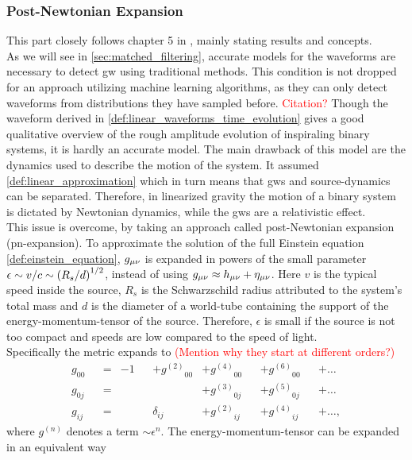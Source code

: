 \subsubsection{Post-Newtonian Expansion}\label{sec:pn_expansion}
This part closely follows chapter 5 in \cite{gwv1}, mainly stating results and concepts.\\
As we will see in \autoref{sec:matched_filtering}, accurate models for the waveforms are necessary to detect \gls{gw} using traditional methods. This condition is not dropped for an approach utilizing machine learning algorithms, as they can only detect waveforms from distributions they have sampled before. \textcolor{red}{Citation?} Though the waveform derived in \eqref{def:linear_waveforms_time_evolution} gives a good qualitative overview of the rough amplitude evolution of inspiraling binary systems, it is hardly an accurate model. The main drawback of this model are the dynamics used to describe the motion of the system. It assumed \eqref{def:linear_approximation} which in turn means that \gls{gws} and source-dynamics can be separated. Therefore, in linearized gravity the motion of a binary system is dictated by Newtonian dynamics, while the \gls{gws} are a relativistic effect.\\
This issue is overcome, by taking an approach called post-Newtonian expansion (\gls{pn}-expansion). To approximate the solution of the full Einstein equation \eqref{def:einstein_equation}, $g_{\mu\nu}$ is expanded in powers of the small parameter $\epsilon\sim v/c \sim {\left( R_s / d \right)}^{1/2}$, instead of using $g_{\mu\nu}\approx h_{\mu\nu} +\eta_{\mu\nu}$. Here $v$ is the typical speed inside the source, $R_s$ is the Schwarzschild radius attributed to the system's total mass and $d$ is the diameter of a world-tube containing the support of the energy-momentum-tensor of the source. Therefore, $\epsilon$ is small if the source is not too compact and speeds are low compared to the speed of light.\\
Specifically the metric expands to \textcolor{red}{(Mention why they start at different orders?)}
\begin{align}\label{def:pn_expansion_metric}
g_{00} && = & -1 && +{g^{(2)}}_{00} & +{g^{(4)}}_{00} && +{g^{(6)}}_{00} && +\dotsc\nonumber\\
g_{0j} && = & && & +{g^{(3)}}_{0j} && +{g^{(5)}}_{0j} && +\dotsc\\
g_{ij} && = & &&\delta_{ij} & +{g^{(2)}}_{ij} && +{g^{(4)}}_{ij} && +\dotsc,\nonumber
\end{align}
where ${g^{(n)}}$ denotes a term $\sim \epsilon^n$. The energy-momentum-tensor can be expanded in an equivalent way
